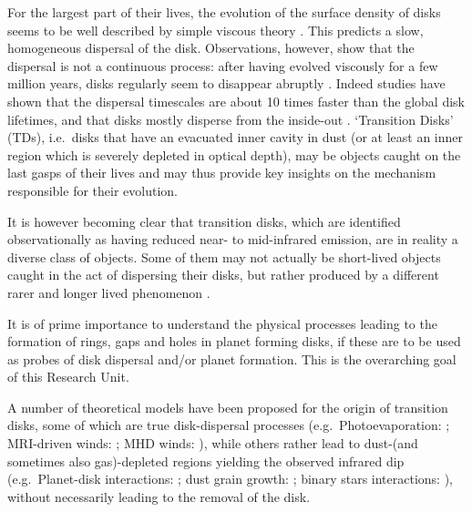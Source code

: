 \documentclass[10pt,fleqn,twoside]{article}
\begin{document}
For the largest part
of their lives, the evolution of the surface density of disks seems to be well
described by simple viscous theory 
\citep[e.g.][]{1998ApJ...495..385H, 1974MNRAS.168..603L}.
This predicts a slow, homogeneous dispersal of the
disk. Observations, however, show that the dispersal is not a
continuous process: after having evolved viscously for a few million
years, disks regularly seem to disappear abruptly 
\citep[e.g.,][]{1995ApJS..101..117K, 2010ApJS..186..111L}.
Indeed studies have shown that the dispersal
timescales are about 10 times faster than the global disk lifetimes, and
that disks mostly disperse from the inside-out 
\citep[e.g.,][]{2011MNRAS.410..671E, 2013MNRAS.428.3327K}. 
`Transition Disks' (TDs), i.e.\ disks
that have an evacuated inner cavity in dust (or at least an inner region
which is severely depleted in optical depth), may be objects caught on
the last gasps of their lives and may thus provide key insights on the
mechanism responsible for their evolution. 

It is however becoming clear that transition disks, which are
identified observationally as having reduced near- to mid-infrared
emission,  are in reality a diverse class of objects. Some of them may
not actually be short-lived objects caught in the act of dispersing
their disks, but rather produced by a different rarer and longer lived
phenomenon 
\citep[see e.g.,][]{2016PASA...33....5O, 2016ApJ...825...77D}.
\begin{highlight}
It is of prime
importance to understand the physical processes leading to the
formation of rings, gaps and holes in planet forming disks, if these are to
be used as probes of disk dispersal and/or planet formation. This is
the overarching goal of this Research Unit. 
\end{highlight}

A number of theoretical models have been proposed for the origin of
transition disks, some of which are true disk-dispersal processes
(e.g.\ Photoevaporation: \citep{2001MNRAS.328..485C}; MRI-driven
winds: \citep{2009ApJ...691L..49S}; MHD winds: \citep{2016ApJ...821...80B}), 
while others
rather lead to dust-(and sometimes also gas)-depleted regions yielding
the observed infrared dip (e.g.\ Planet-disk interactions: 
\citep{2005ApJ...630L.185C}; dust grain growth: \citep{2005A&A...434..971D}; 
binary stars interactions: \citep{1992ApJ...395L.115M}), without necessarily leading to
the removal of the disk.  
\end{document}

